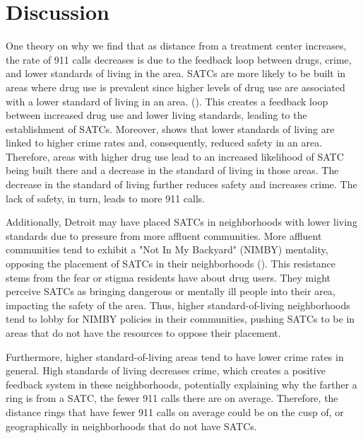 \documentclass[12pt]{article}
\begin{document}

\section{Discussion}
\label{sec:discussion}

One theory on why we find that as distance from a treatment center increases, the rate of 911 calls decreases is due to the feedback loop between drugs, crime, and lower standards of living in the area. SATCs are more likely to be built in areas where drug use is prevalent since higher levels of drug use are associated with a lower standard of living in an area. (\cite{drugs_and_crime}). This creates a feedback loop between increased drug use and lower living standards, leading to the establishment of SATCs. Moreover, \cite{drugs_and_crime} shows that lower standards of living are linked to higher crime rates and, consequently, reduced safety in an area. Therefore, areas with higher drug use lead to an increased likelihood of SATC being built there and a decrease in the standard of living in those areas. The decrease in the standard of living further reduces safety and increases crime. The lack of safety, in turn, leads to more 911 calls.  

Additionally, Detroit may have placed SATCs in neighborhoods with lower living standards due to pressure from more affluent communities. More affluent communities tend to exhibit a "Not In My Backyard" (NIMBY) mentality, opposing the placement of SATCs in their neighborhoods (\citealp{NIMBY}). This resistance stems from the fear or stigma residents have about drug users. They might perceive SATCs as bringing dangerous or mentally ill people into their area, impacting the safety of the area. Thus, higher standard-of-living neighborhoods tend to lobby for NIMBY policies in their communities, pushing SATCs to be in areas that do not have the resources to oppose their placement.

Furthermore, higher standard-of-living areas tend to have lower crime rates in general. High standards of living decreases crime, which creates a positive feedback system in these neighborhoods, potentially explaining why the farther a ring is from a SATC, the fewer 911 calls there are on average. Therefore, the distance rings that have fewer 911 calls on average could be on the cusp of, or geographically in neighborhoods that do not have SATCs. 
    
\end{document}

